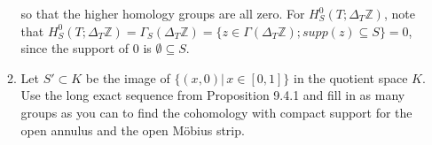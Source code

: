 \documentclass{article}
\begin{document}
\begin{enumerate}
\begin{enumerate}
so that the higher homology groups are all zero. For $H^0_S(T;\Delta_T\mathbb{Z})$, note that $H^0_S(T;\Delta_T\mathbb{Z})= \Gamma_S(\Delta_T\mathbb{Z})=\{z \in \Gamma(\Delta_T \mathbb{Z}); supp(z) \subseteq S\} =0$, since the support of $0$ is $\emptyset \subseteq S$. \\
 
\item
Let $S'\subset K$ be the image of $\{(x,0)|\,x\in[0,1]\}$ in the quotient space $K$.
Use the long exact sequence from Proposition 9.4.1 and fill in as many groups as you can to find the cohomology with compact support for 
the open annulus and the open M\"obius strip.
\end{enumerate}


\end{enumerate}
\end{document}
